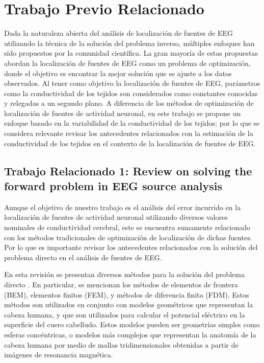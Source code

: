 %
\chapter{Trabajo Previo Relacionado}
\label{sec:related}

 Dada la naturaleza abierta del análisis de localización de fuentes de EEG utilizando la técnica de la solución del problema inverso, múltiples enfoques han sido propuestos por la comunidad científica. La gran mayoría de estas propuestas abordan la localización de fuentes de EEG como un problema de optimización, donde el objetivo es encontrar la mejor solución que se ajuste a los datos observados. Al tener como objetivo la localización de fuentes de EEG, parámetros como la conductividad de los tejidos son considerados como constantes conocidas y relegadas a un segundo plano. A diferencia de los métodos de optimización de localización de fuentes de actividad neuronal, en este trabajo se propone un enfoque basado en la variabilidad de la conductividad de los tejidos; por lo que se considera relevante revisar los antecedentes relacionados con la estimación de la conductividad de los tejidos en el contexto de la localización de fuentes de EEG. 
 
\section{Trabajo Relacionado 1: Review on solving the forward problem in EEG source analysis}
\label{sec:related:hallez}

Aunque el objetivo de nuestro trabajo es el análisis del error incurrido en la localización de fuentes de actividad neuronal utilizando diversos valores nominales de conductividad cerebral, este se encuentra sumamente relacionado con los métodos tradicionales de optimización de localización de dichas fuentes. Por lo que es importante revisar los antecedentes relacionados con la solución del problema directo en el análisis de fuentes de EEG.

En esta revisión se presentan diversos métodos para la solución del problema directo \cite{Hallez2007}. En particular, se mencionan los métodos de elementos de frontera (BEM), elementos finitos (FEM), y métodos de diferencia finita (FDM). Estos métodos son utilizados en conjunto con modelos geométricos que representan la cabeza humana, y que son utilizados para calcular el potencial eléctrico en la superficie del cuero cabelludo. Estos modelos pueden ser geometrías simples como esferas concéntricas, o modelos más complejos que representan la anatomía de la cabeza humana por medio de mallas tridimensionales obtenidas a partir de imágenes de resonancia magnética.

